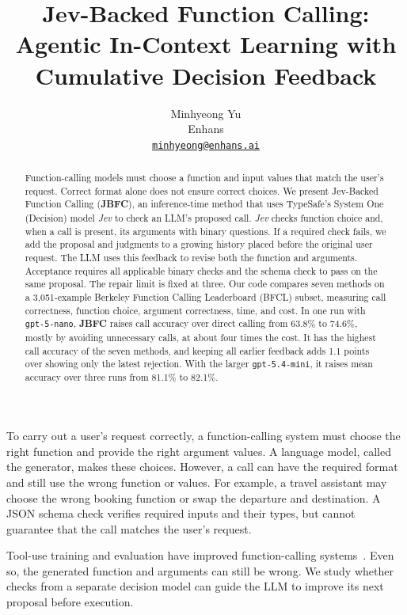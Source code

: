 \documentclass[10pt,twocolumn,letterpaper]{article}
\title{\vspace{-1.3em}\textbf{Jev-Backed Function Calling:\\Agentic In-Context Learning with Cumulative Decision Feedback}\vspace{-0.4em}}
\author{Minhyeong Yu\\[-1pt]{\small Enhans}\\[-1pt]{\small\href{mailto:minhyeong@enhans.ai}{\texttt{minhyeong@enhans.ai}}}}
\date{\vspace{-2.5em}}
\makeatletter
\renewcommand{\section}{\@startsection{section}{1}{\z@}{2.5ex \@plus 1ex \@minus .2ex}{1.5ex \@plus .2ex}{\normalfont\Large\bfseries}}
\makeatother
\begin{document}
\maketitle
\begin{abstract}
Function-calling models must choose a function and input values that match the user's request. Correct format alone does not ensure correct choices. We present Jev-Backed Function Calling (\textbf{JBFC}), an inference-time method that uses TypeSafe's System One (Decision) model \textit{Jev} to check an LLM's proposed call. \textit{Jev} checks function choice and, when a call is present, its arguments with binary questions. If a required check fails, we add the proposal and judgments to a growing history placed before the original user request. The LLM uses this feedback to revise both the function and arguments. Acceptance requires all applicable binary checks and the schema check to pass on the same proposal. The repair limit is fixed at three. Our code compares seven methods on a 3,051-example Berkeley Function Calling Leaderboard (BFCL) subset, measuring call correctness, function choice, argument correctness, time, and cost. In one run with \texttt{gpt-5-nano}, \textbf{JBFC} raises call accuracy over direct calling from 63.8\% to 74.6\%, mostly by avoiding unnecessary calls, at about four times the cost. It has the highest call accuracy of the seven methods, and keeping all earlier feedback adds 1.1 points over showing only the latest rejection. With the larger \texttt{gpt-5.4-mini}, it raises mean accuracy over three runs from 81.1\% to 82.1\%.
\end{abstract}

\section{Introduction}
To carry out a user's request correctly, a function-calling system must choose the right function and provide the right argument values. A language model, called the generator, makes these choices. However, a call can have the required format and still use the wrong function or values. For example, a travel assistant may choose the wrong booking function or swap the departure and destination. A JSON schema check verifies required inputs and their types, but cannot guarantee that the call matches the user's request.

Tool-use training and evaluation have improved function-calling systems~\cite{patil2024gorilla,qin2024toolllm,patil2025bfcl}. Even so, the generated function and arguments can still be wrong. We study whether checks from a separate decision model can guide the LLM to improve its next proposal before execution.
\end{document}
